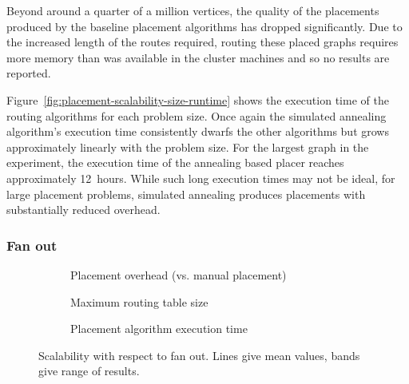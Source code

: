 				Beyond around a quarter of a million vertices, the quality of the
				placements produced by the baseline placement algorithms has dropped
				significantly. Due to the increased length of the routes required,
				routing these placed graphs requires more memory than was available in
				the cluster machines and so no results are reported.
				
				Figure~\ref{fig:placement-scalability-size-runtime} shows the execution
				time of the routing algorithms for each problem size. Once again the
				simulated annealing algorithm's execution time consistently dwarfs the
				other algorithms but grows approximately linearly with the problem
				size. For the largest graph in the experiment, the execution time of
				the annealing based placer reaches approximately 12~hours. While such
				long execution times may not be ideal, for large placement problems,
				simulated annealing produces placements with substantially reduced
				overhead.
			
			\subsubsection{Fan out}
			
				\begin{figure}
					\center
					\begin{subfigure}{\linewidth}
						\center
						
						\caption{Placement overhead (vs. manual placement)}
						\label{fig:placement-scalability-fanout-quality}
					\end{subfigure}
					
					\vspace*{1em}
					
					\begin{subfigure}{\linewidth}
						\center
						
						\caption{Maximum routing table size}
						\label{fig:placement-scalability-fanout-entries}
					\end{subfigure}
					
					\vspace*{1em}
					
					\begin{subfigure}{\linewidth}
						\center
						
						\caption{Placement algorithm execution time}
						\label{fig:placement-scalability-fanout-runtime}
					\end{subfigure}
					
						\caption[Placer scalability with respect to fan out.]%
						{Scalability with respect to fan out. Lines give mean values,
						bands give range of results.}
					\label{fig:placement-scalability-fanout}
				\end{figure}
				
